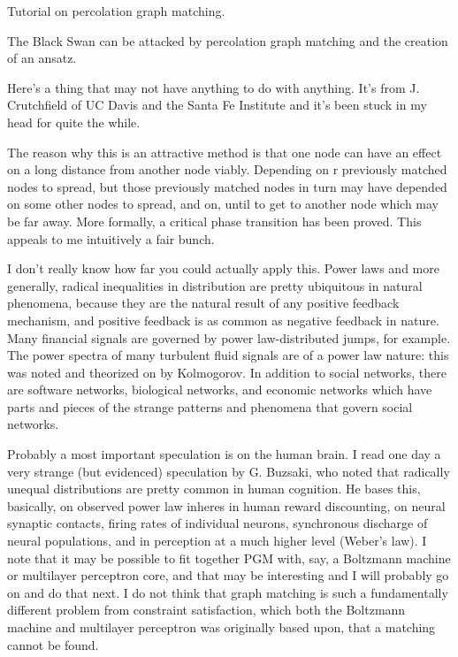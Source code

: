\documentclass[12pt]{article}
\begin{document}
Tutorial on percolation graph matching.

The Black Swan can be attacked by percolation graph matching and the creation of an ansatz.

Here's a thing that may not have anything to do with anything. It's from J. Crutchfield of UC Davis and the Santa Fe Institute and it's been stuck in my head for quite the while.

The reason why this is an attractive method is that one node can have an effect on a long distance from another node viably. Depending on r previously matched nodes to spread, but those previously matched nodes in turn may have depended on some other nodes to spread, and on, until to get to another node which may be far away. More formally, a critical phase transition has been proved. This appeals to me intuitively a fair bunch.

I don't really know how far you could actually apply this. Power laws and more generally, radical inequalities in distribution are pretty ubiquitous in natural phenomena, because they are the natural result of any positive feedback mechanism, and positive feedback is as common as negative feedback in nature. Many financial signals are governed by power law-distributed jumps, for example. The power spectra of many turbulent fluid signals are of a power law nature: this was noted and theorized on by Kolmogorov. In addition to social networks, there are software networks, biological networks, and economic networks which have parts and pieces of the strange patterns and phenomena that govern social networks.

Probably a most important speculation is on the human brain. I read one day a very strange (but evidenced) speculation by G. Buzsaki, who noted that radically unequal distributions are pretty common in human cognition. He bases this, basically, on observed power law inheres in human reward discounting, on neural synaptic contacts, firing rates of individual neurons, synchronous discharge of neural populations, and in perception at a much higher level (Weber's law). I note that it may be possible to fit together PGM with, say, a Boltzmann machine or multilayer perceptron core, and that may be interesting and I will probably go on and do that next. I do not think that graph matching is such a fundamentally different problem from constraint satisfaction, which both the Boltzmann machine and multilayer perceptron was originally based upon, that a matching cannot be found.
\end{document}
